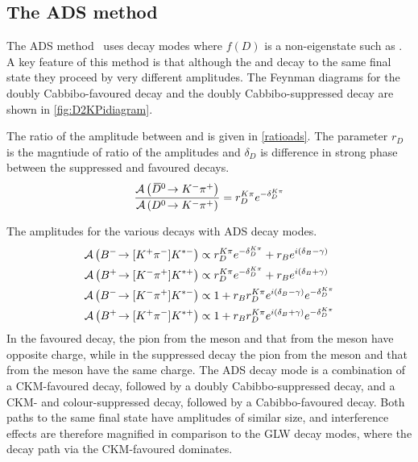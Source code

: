 \subsection{The ADS method}

The ADS method~\cite{ADS,ADS-2001} uses \D decay modes where $f(D)$ is a non-\CP eigenstate such as \decay{\D}{\Km\pip}. A key feature of this method is that although the \Dz and \Dzb decay to the same final state they proceed by very different amplitudes. The Feynman diagrams for the doubly Cabbibo-favoured \decay{\Dz}{\Km\pip} decay and the doubly Cabbibo-suppressed \decay{\Dzb}{\Kp\pim} decay are shown in \fig\ref{fig:D2KPidiagram}.


The ratio of the amplitude between \decay{\Dzb}{\Km\pip} and \decay{\Dz}{\Km\pip} is given in \eqn\ref{ratioads}. The parameter $r_D$ is the magntiude of ratio of the amplitudes and $\delta_D$ is difference in strong phase between the suppressed and favoured decays.
\begin{equation}
\frac{\mathcal{A}\left({{\kern 0.2em\overline{\kern -0.2em D}{}}{}^0}\!\rightarrow {\ensuremath{{K}^-}}{\ensuremath{{\pi}^+}}\right)}{\mathcal{A}\left({{D}^0}\!\rightarrow {\ensuremath{{K}^-}}{\ensuremath{{\pi}^+}}\right)} = r_D^{K\pi}e^{-\delta_D^{K\pi}}
\label{ratioads}
\end{equation}

The amplitudes for the various \decay{\Bpm}{\D\Kstarpm} decays with ADS decay modes. 
\begin{align}
\mathcal{A}\left({{{B}^-}}\!\rightarrow [{{K}^+}{{\pi}^-}]{\ensuremath{{K}^{*-}}}\right) &\propto r_D^{K\pi}e^{-\delta_D^{K\pi}} + r_B e^{i(\delta_B - \gamma)} \label{adsBdecaym} \\
\mathcal{A}\left({{{B}^+}}\!\rightarrow [{{K}^-}{{\pi}^+}]{\ensuremath{{K}^{*+}}}\right) &\propto r_D^{K\pi}e^{-\delta_D^{K\pi}} + r_B e^{i(\delta_B + \gamma)} \label{adsBdecayp} \\
\mathcal{A}\left({{{B}^-}}\!\rightarrow [{{K}^-}{{\pi}^+}]{\ensuremath{{K}^{*-}}}\right) &\propto 1 + r_B r_D^{K\pi} e^{i(\delta_B - \gamma)}e^{-\delta_D^{K\pi}} \label{favBdecaym} \\
\mathcal{A}\left({{{B}^+}}\!\rightarrow [{{K}^+}{{\pi}^-}]{\ensuremath{{K}^{*+}}}\right) &\propto 1 + r_B r_D^{K\pi} e^{i(\delta_B + \gamma)}e^{-\delta_D^{K\pi}} \label{favBdecayp} 
\end{align}
In the favoured decay, the pion from the \D meson and that from the \Kstarm meson have opposite charge, while in the suppressed decay the pion from the \D meson and that from the \Kstarm meson have the same charge. The ADS decay mode is a combination of a CKM-favoured \decay{\Bm}{\Dz\Kstarm} decay, followed by a doubly Cabibbo-suppressed \decay{\Dz}{\Kp\pim} decay, and a CKM- and colour-suppressed \decay{\Bm}{\Dzb\Kstarm} decay, followed by a Cabibbo-favoured \decay{\Dzb}{\Kp\pim} decay. Both paths to the same final state have amplitudes of similar size, and interference effects are therefore magnified in comparison to the GLW decay modes, where the decay path via the CKM-favoured \decay{\Bm}{\Dz\Kstarm} dominates.

